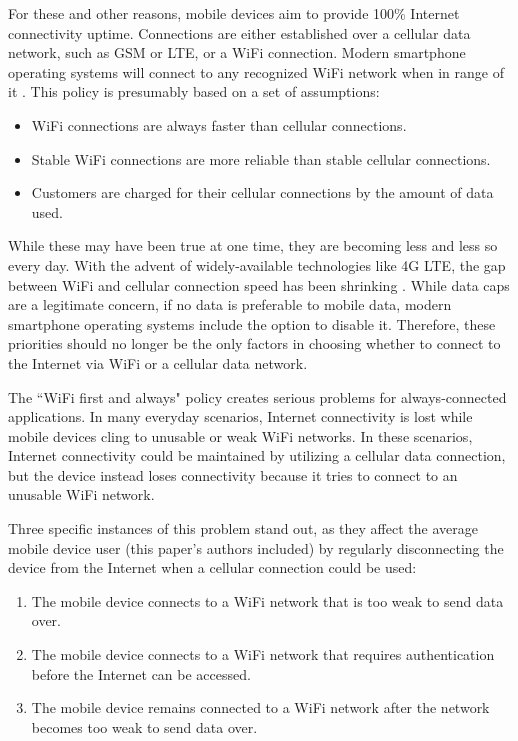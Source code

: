 For these and other reasons, mobile devices aim to provide 100\% Internet connectivity uptime. Connections are either established over a cellular data network, such as GSM or LTE, or a WiFi connection. Modern smartphone operating systems will connect to any recognized WiFi network when in range of it \cite{Google2013}. This policy is presumably based on a set of assumptions:

\begin{itemize}
\item WiFi connections are always faster than cellular connections.
\item Stable WiFi connections are more reliable than stable cellular connections.
\item Customers are charged for their cellular connections by the amount of data used.
\end{itemize}

While these may have been true at one time, they are becoming less and less so every day. With the advent of widely-available technologies like 4G LTE, the gap between WiFi and cellular connection speed has been shrinking \cite{Huang:2012:CEP:2307636.2307658}. While data caps are a legitimate concern, if no data is preferable to mobile data, modern smartphone operating systems include the option to disable it. Therefore, these priorities should no longer be the only factors in choosing whether to connect to the Internet via WiFi or a cellular data network.

The ``WiFi first and always" policy creates serious problems for always-connected applications. In many everyday scenarios, Internet connectivity is lost while mobile devices cling to unusable or weak WiFi networks. In these scenarios, Internet connectivity could be maintained by utilizing a cellular data connection, but the device instead loses connectivity because it tries to connect to an unusable WiFi network.

Three specific instances of this problem stand out, as they affect the average mobile device user (this paper's authors included) by regularly disconnecting the device from the Internet when a cellular connection could be used:

\begin{enumerate}
\item The mobile device connects to a WiFi network that is too weak to send data over.
\item The mobile device connects to a WiFi network that requires authentication before the Internet can be accessed.
\item The mobile device remains connected to a WiFi network after the network becomes too weak to send data over.
\end{enumerate}

